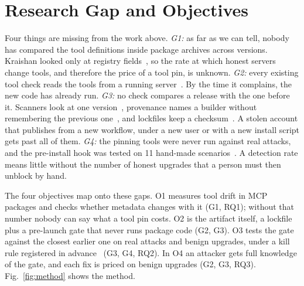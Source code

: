 \section{Research Gap and Objectives}
\label{sec:gap}
Four things are missing from the work above.
\emph{G1:} as far as we can tell, nobody has compared the tool definitions inside package archives across
versions. Kraishan looked only at registry
fields~\cite{kraishan2026drift}, so the rate at which honest servers change tools, and therefore the price of a tool pin,
is unknown.
\emph{G2:} every existing tool check reads the tools from a running server~\cite{invariant2025mcpscan,mcppin,mcpseal}.
By the time it complains, the new code has already run.
\emph{G3:} no check compares a release with the one before it. Scanners look at one version~\cite{sejfia2022amalfi},
provenance names a builder without remembering the previous one~\cite{slsa2023provenance}, and lockfiles keep a
checksum~\cite{gamage2025lockfiles}. A stolen account that publishes from a new workflow, under a new user or with a new
install script gets past all of them.
\emph{G4:} the pinning tools were never run against real attacks, and the pre-install hook was tested on 11 hand-made
scenarios~\cite{bagmar2026setup}. A detection rate means little without the number of honest upgrades that a person must
then unblock by hand.

The four objectives map onto these gaps. O1 measures tool drift in MCP packages and checks whether metadata
changes with it (G1, RQ1); without that number nobody can say what a tool pin costs. O2 is the artifact itself, a
lockfile plus a pre-launch gate that never runs package code (G2, G3). O3 tests the gate against the closest earlier
one on real attacks and benign upgrades, under a kill rule registered in advance~\cite{osf2026prereg} (G3, G4, RQ2).
In O4 an attacker gets full knowledge of the gate, and each fix is priced on benign upgrades (G2, G3, RQ3).
Fig.~\ref{fig:method} shows the method.
